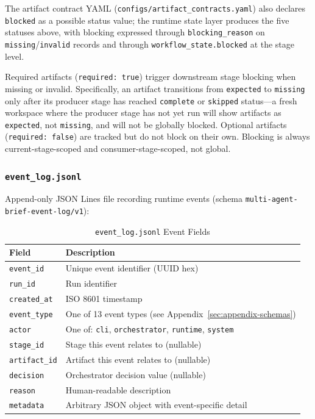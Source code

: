 \documentclass[11pt,a4paper]{article}
\begin{document}
The artifact contract YAML (\texttt{configs/artifact\_contracts.yaml}) also declares \texttt{blocked} as a possible status value; the runtime state layer produces the five statuses above, with blocking expressed through \texttt{blocking\_reason} on \texttt{missing}/\texttt{invalid} records and through \texttt{workflow\_state.blocked} at the stage level.

Required artifacts (\texttt{required: true}) trigger downstream stage blocking when missing or invalid. Specifically, an artifact transitions from \texttt{expected} to \texttt{missing} only after its producer stage has reached \texttt{complete} or \texttt{skipped} status---a fresh workspace where the producer stage has not yet run will show artifacts as \texttt{expected}, not \texttt{missing}, and will not be globally blocked. Optional artifacts (\texttt{required: false}) are tracked but do not block on their own. Blocking is always current-stage-scoped and consumer-stage-scoped, not global.

\subsubsection{\texttt{event\_log.jsonl}}

Append-only JSON Lines file recording runtime events (schema \texttt{multi-agent-brief-event-log/v1}):

\begin{table}[ht]
\centering
\caption{\texttt{event\_log.jsonl} Event Fields}
\label{tab:event-log}
\footnotesize
\begin{tabular}{@{}ll@{}}
\toprule
\textbf{Field} & \textbf{Description} \\
\midrule
\texttt{event\_id} & Unique event identifier (UUID hex) \\
\texttt{run\_id} & Run identifier \\
\texttt{created\_at} & ISO 8601 timestamp \\
\texttt{event\_type} & One of 13 event types (see Appendix~\ref{sec:appendix-schemas}) \\
\texttt{actor} & One of: \texttt{cli}, \texttt{orchestrator}, \texttt{runtime}, \texttt{system} \\
\texttt{stage\_id} & Stage this event relates to (nullable) \\
\texttt{artifact\_id} & Artifact this event relates to (nullable) \\
\texttt{decision} & Orchestrator decision value (nullable) \\
\texttt{reason} & Human-readable description \\
\texttt{metadata} & Arbitrary JSON object with event-specific detail \\
\bottomrule
\end{tabular}
\end{table}
\end{document}
